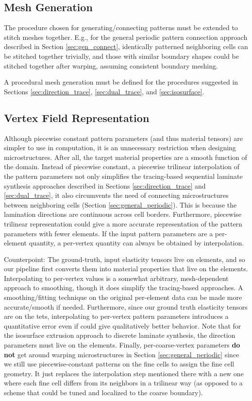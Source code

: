 \documentclass[10pt]{article}
\begin{document}
\subsection{Mesh Generation}
The procedure chosen for generating/connecting patterns must be
extended to stitch meshes together. E.g., for the general periodic pattern
connection approach described in Section \ref{sec:gen_connect}, identically
patterned neighboring cells can be stitched together trivially, and those with
similar boundary shapes could be stitched together after warping, assuming
consistent boundary meshing.

A procedural mesh generation must be defined for the procedures suggested
in Sections \ref{sec:direction_trace}, \ref{sec:dual_trace}, and
\ref{sec:isosurface}.

\subsection{Vertex Field Representation}
Although piecewise constant pattern parameters (and thus material tensors) are
simpler to use in computation, it is an unnecessary restriction when designing
microstructures.  After all, the target material properties are a smooth function
of the domain. Instead of piecewise constant, a piecewise trilinear
interpolation of the pattern parameters not only simplifies the tracing-based
sequential laminate synthesis approaches described in Sections
\ref{sec:direction_trace} and \ref{sec:dual_trace}, it also circumvents the need
of connecting microstructures between neighboring cells (Section
\ref{sec:general_periodic}).  This is because the lamination directions are
continuous across cell borders.  Furthermore, piecewise trilinear representation
could give a more accurate representation of the pattern parameters with fewer
elements. If the input pattern parameters are a per-element quantity, a
per-vertex quantity can always be obtained by interpolation.

Counterpoint:
The ground-truth, input elasticity tensors live on elements, and so our pipeline
first converts them into material properties that live on the elements.
Interpolating to per-vertex values is a somewhat arbitrary, mesh-dependent
approach to smoothing, though it does simplify the tracing-based approaches. A
smoothing/fitting technique on the original per-element data can be made more
accurate/smooth if needed. Furthermore, since our ground truth elasticity
tensors are on the tets, interpolating to per-vertex pattern parameters
introduces a quantitative error even if could give qualitatively better
behavior. Note that for the isosurface extrusion approach to discrete laminate
synthesis, the direction parameters must live on the elements. Finally,
per-coarse-vertex parameters \textbf{do not} get around warping microstructures
in Section \ref{sec:general_periodic} since we still use piecewise-constant
patterns on the fine cells to assign the fine cell geometry. It just replaces
the interpolation step mentioned there with a new one where each fine cell
differs from its neighbors in a trilinear way (as opposed to a scheme that
could be tuned and localized to the coarse boundary).
\end{document}
